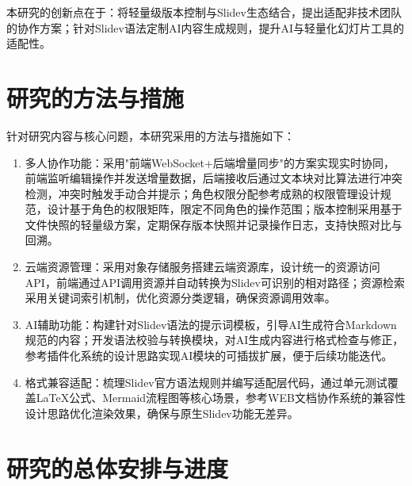 本研究的创新点在于：将轻量级版本控制与Slidev生态结合，提出适配非技术团队的协作方案；针对Slidev语法定制AI内容生成规则，提升AI与轻量化幻灯片工具的适配性。

\section{研究的方法与措施}

针对研究内容与核心问题，本研究采用的方法与措施如下：
\begin{enumerate}[label=(\arabic*)]
    \item 多人协作功能：采用"前端WebSocket+后端增量同步"的方案实现实时协同，前端监听编辑操作并发送增量数据，后端接收后通过文本块对比算法进行冲突检测，冲突时触发手动合并提示；角色权限分配参考成熟的权限管理设计规范\cite{kuhlmann2013uml,li2011reengineering}，设计基于角色的权限矩阵，限定不同角色的操作范围；版本控制采用基于文件快照的轻量级方案，定期保存版本快照并记录操作日志，支持快照对比与回溯。
    \item 云端资源管理：采用对象存储服务搭建云端资源库，设计统一的资源访问API，前端通过API调用资源并自动转换为Slidev可识别的相对路径；资源检索采用关键词索引机制，优化资源分类逻辑，确保资源调用效率。
    \item AI辅助功能：构建针对Slidev语法的提示词模板，引导AI生成符合Markdown规范的内容；开发语法校验与转换模块，对AI生成内容进行格式检查与修正，参考插件化系统的设计思路\cite{cai2022microfrontend}实现AI模块的可插拔扩展，便于后续功能迭代。
    \item 格式兼容适配：梳理Slidev官方语法规则并编写适配层代码，通过单元测试覆盖LaTeX公式、Mermaid流程图等核心场景，参考WEB文档协作系统的兼容性设计思路\cite{tan2012web,li2020cscw}优化渲染效果，确保与原生Slidev功能无差异。
\end{enumerate}

\section{研究的总体安排与进度}

